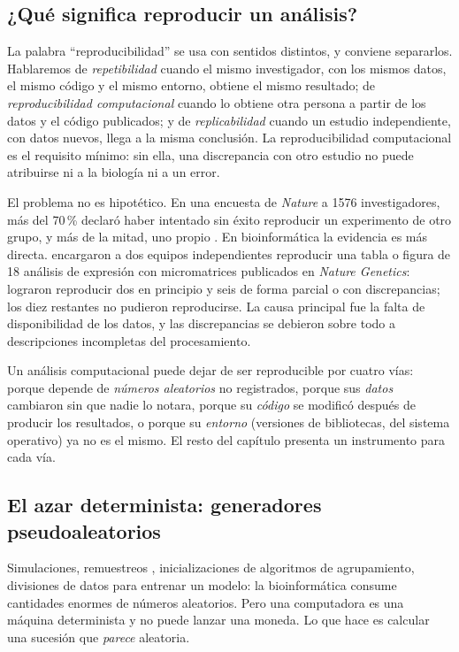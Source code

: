 \subsection{¿Qué significa reproducir un análisis?}

La palabra ``reproducibilidad'' se usa con sentidos distintos, y conviene separarlos. Hablaremos de \emph{repetibilidad} cuando el mismo investigador, con los mismos datos, el mismo código y el mismo entorno, obtiene el mismo resultado; de \emph{reproducibilidad computacional} cuando lo obtiene otra persona a partir de los datos y el código publicados; y de \emph{replicabilidad} cuando un estudio independiente, con datos nuevos, llega a la misma conclusión. La reproducibilidad computacional es el requisito mínimo: sin ella, una discrepancia con otro estudio no puede atribuirse ni a la biología ni a un error.

El problema no es hipotético. En una encuesta de \emph{Nature} a \num{1576} investigadores, más del 70\,\% declaró haber intentado sin éxito reproducir un experimento de otro grupo, y más de la mitad, uno propio \parencite{c00-baker2016}. En bioinformática la evidencia es más directa. \textcite{c00-ioannidis2009} encargaron a dos equipos independientes reproducir una tabla o figura de 18 análisis de expresión con micromatrices publicados en \emph{Nature Genetics}: lograron reproducir dos en principio y seis de forma parcial o con discrepancias; los diez restantes no pudieron reproducirse. La causa principal fue la falta de disponibilidad de los datos, y las discrepancias se debieron sobre todo a descripciones incompletas del procesamiento.


Un análisis computacional puede dejar de ser reproducible por cuatro vías: porque depende de \emph{números aleatorios} no registrados, porque sus \emph{datos} cambiaron sin que nadie lo notara, porque su \emph{código} se modificó después de producir los resultados, o porque su \emph{entorno} (versiones de bibliotecas, del sistema operativo) ya no es el mismo. El resto del capítulo presenta un instrumento para cada vía.

\subsection{El azar determinista: generadores pseudoaleatorios}

Simulaciones, remuestreos , inicializaciones de algoritmos de agrupamiento, divisiones de datos para entrenar un modelo: la bioinformática consume cantidades enormes de números aleatorios. Pero una computadora es una máquina determinista y no puede lanzar una moneda. Lo que hace es calcular una sucesión que \emph{parece} aleatoria.

